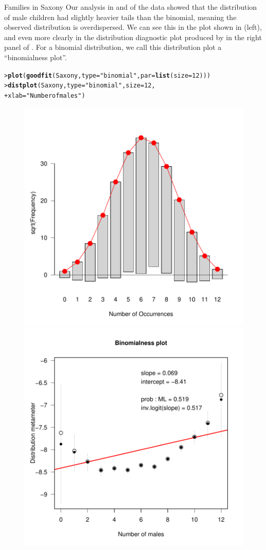 \documentclass[10pt,krantz2]{krantz}\usepackage[]{graphicx}\usepackage[]{color}
\makeatletter
\newcommand{\hlnum}[1]{\textcolor[rgb]{0.686,0.059,0.569}{#1}}%
\newcommand{\hlstr}[1]{\textcolor[rgb]{0.192,0.494,0.8}{#1}}%
\newcommand{\hlstd}[1]{\textcolor[rgb]{0.345,0.345,0.345}{#1}}%
\newcommand{\hlkwc}[1]{\textcolor[rgb]{0.333,0.667,0.333}{#1}}%
\newcommand{\hlkwd}[1]{\textcolor[rgb]{0.737,0.353,0.396}{\textbf{#1}}}%
\newenvironment{kframe}{%
 \def\at@end@of@kframe{}%
 \ifinner\ifhmode%
  \def\at@end@of@kframe{\end{minipage}}%
  \begin{minipage}{\columnwidth}%
 \fi\fi%
 \def\FrameCommand##1{\hskip\@totalleftmargin \hskip-\fboxsep
 \colorbox{shadecolor}{##1}\hskip-\fboxsep
     \hskip-\linewidth \hskip-\@totalleftmargin \hskip\columnwidth}%
 \MakeFramed {\advance\hsize-\width
   \@totalleftmargin\z@ \linewidth\hsize
   \@setminipage}}%
 {\par\unskip\endMakeFramed%
 \at@end@of@kframe}
\newenvironment{knitrout}{}{} %
\renewenvironment{knitrout}{\small\renewcommand{\baselinestretch}{.85}}{} %
\makeatother
\begin{document}
\begin{Example}{Families in Saxony}
Our analysis in  and  of
the  data
showed that the distribution of male children had slightly heavier tails
than the binomial, meaning the observed distribution is overdispersed.
We can see this in the  plot shown in  (left),
and even more clearly in the distribution diagnostic
plot produced
by  in the right panel of .
For a binomial distribution, we call
this distribution plot a ``binomialness plot''.

\begin{knitrout}
\color{fgcolor}\begin{kframe}
\begin{alltt}
\hlstd{> }\hlkwd{plot}\hlstd{(}\hlkwd{goodfit}\hlstd{(Saxony,} \hlkwc{type}\hlstd{=}\hlstr{"binomial"}\hlstd{,} \hlkwc{par}\hlstd{=}\hlkwd{list}\hlstd{(}\hlkwc{size}\hlstd{=}\hlnum{12}\hlstd{)))}
\hlstd{> }\hlkwd{distplot}\hlstd{(Saxony,} \hlkwc{type} \hlstd{=} \hlstr{"binomial"}\hlstd{,} \hlkwc{size} \hlstd{=} \hlnum{12}\hlstd{,}
\hlstd{+ }  \hlkwc{xlab}\hlstd{=}\hlstr{"Number of males"}\hlstd{)}
\end{alltt}
\end{kframe}\begin{figure}[!htbp]

\centerline{\includegraphics[width=.49\textwidth]{ch03/fig/distplot3-1} 
\includegraphics[width=.49\textwidth]{ch03/fig/distplot3-2} }


\end{figure}
\end{knitrout}
\end{Example}
\end{document}
